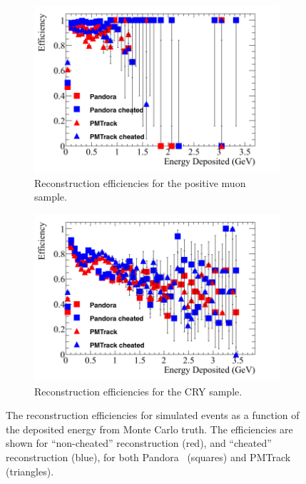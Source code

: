 \begin{figure}
  \centering
  \begin{subfigure}{0.48\textwidth}
    \centering
    \includegraphics[width=\textwidth]{Effic_AntiMuon_500V_All_EnDepos}
    \caption{Reconstruction efficiencies for the positive muon sample.}
    \label{fig:SimEffic_EnDepos_AMu}
  \end{subfigure}%
  \hspace{0.03\textwidth}%
  \begin{subfigure}{0.48\textwidth}
    \centering
    \includegraphics[width=\textwidth]{Effic_Cosmics_500V_All_EnDepos}
    \caption{Reconstruction efficiencies for the CRY sample.}
    \label{fig:SimEffic_EnDepos_CRY}
  \end{subfigure}
  \caption[The reconstruction efficiencies for simulated events as a function of the deposited energy from Monte Carlo truth.]
          {The reconstruction efficiencies for simulated events as a function of the deposited energy from Monte Carlo truth. The efficiencies are shown for ``non-cheated'' reconstruction (red), and ``cheated'' reconstruction (blue), for both Pandora~\citep{Pandora} (squares) and PMTrack~\citep{PMTrack} (triangles).}
          \label{fig:SimEffic_EnDepos}
\end{figure}

